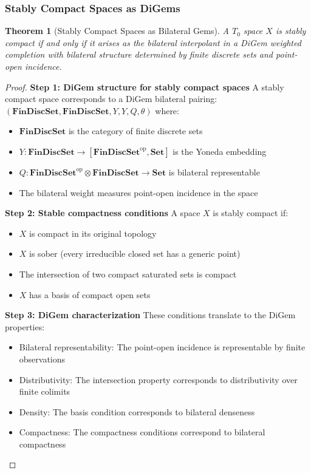 \documentclass[11pt]{article}
\theoremstyle{plain}
\newtheorem{theorem}{Theorem}[section]
\theoremstyle{definition}
\theoremstyle{remark}
\newcommand{\op}{\mathrm{op}}
\begin{document}
\subsubsection{Stably Compact Spaces as DiGems}

\begin{theorem}[Stably Compact Spaces as Bilateral Gems]\label{thm:stably-compact-digems}
A $T_0$ space $X$ is stably compact if and only if it arises as the bilateral interpolant in a DiGem weighted completion with bilateral structure determined by finite discrete sets and point-open incidence.
\end{theorem}

\begin{proof}
\textbf{Step 1: DiGem structure for stably compact spaces}
A stably compact space corresponds to a DiGem bilateral pairing:
$(\mathbf{FinDiscSet}, \mathbf{FinDiscSet}, Y, Y, Q, \theta)$ where:
\begin{itemize}
\item $\mathbf{FinDiscSet}$ is the category of finite discrete sets
\item $Y : \mathbf{FinDiscSet} \to [\mathbf{FinDiscSet}^{\op}, \mathbf{Set}]$ is the Yoneda embedding  
\item $Q : \mathbf{FinDiscSet}^{\op} \otimes \mathbf{FinDiscSet} \to \mathbf{Set}$ is bilateral representable
\item The bilateral weight measures point-open incidence in the space
\end{itemize}

\textbf{Step 2: Stable compactness conditions}
A space $X$ is stably compact \cite{johnstone1982stone} if:
\begin{itemize}
\item $X$ is compact in its original topology
\item $X$ is sober (every irreducible closed set has a generic point)  
\item The intersection of two compact saturated sets is compact
\item $X$ has a basis of compact open sets
\end{itemize}

\textbf{Step 3: DiGem characterization}
These conditions translate to the DiGem properties:
\begin{itemize}
\item Bilateral representability: The point-open incidence is representable by finite observations
\item Distributivity: The intersection property corresponds to distributivity over finite colimits
\item Density: The basis condition corresponds to bilateral denseness
\item Compactness: The compactness conditions correspond to bilateral compactness
\end{itemize}


\end{proof}
\end{document}
